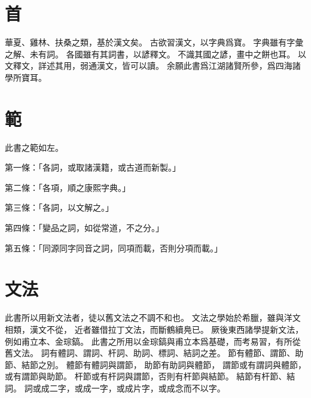 \section{首}
華夏、雞林、扶桑之類，基於漢文矣。
古欲習漢文，以字典爲寶。
字典雖有字彙之解、未有詞。
各國雖有其詞書，以諺釋文。
不識其國之諺，畫中之餅也耳。
以文釋文，詳述其用，弱通漢文，皆可以讀。
余願此書爲江湖諸賢所參，爲四海諸學所寶耳。
\section{範}
此書之範如左。
\par 第一條：「各詞，或取諸漢籍，或古道而新製。」
\par 第二條：「各項，順之康熙字典。」
\par 第三條：「各詞，以文解之。」
\par 第四條：「變品之詞，如從常道，不之分。」
\par 第五條：「同源同字同音之詞，同項而載，否則分項而載。」
\section{文法}
此書所以用新文法者，徒以舊文法之不調不和也。
文法之學始於希臘，雖與洋文相類，漢文不從，
近者雖借拉丁文法，而斷鶴續鳧已。
厥後東西諸學提新文法，例如甫立本、金琮鎬。
此書之所用以金琮鎬與甫立本爲基礎，而考易習，有所從舊文法。
詞有體詞、謂詞、杆詞、助詞、標詞、結詞之差。
節有體節、謂節、助節、結節之別。
體節有體詞與謂節，
助節有助詞與體節，
謂節或有謂詞與體節，或有謂節與助節。
杆節或有杆詞與謂節，否則有杆節與結節。
結節有杆節、結詞。
詞或成二字，或成一字，或成片字，或成念而不以字。
